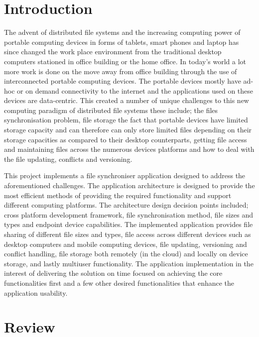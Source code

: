 \documentclass[11pt]{article}
\begin{document}
\section{Introduction}

The advent of distributed file systems and the increasing computing power of portable computing devices in forms of tablets, smart phones and laptop has since changed the work place environment from the traditional desktop computers stationed in office building or the home office. In today's world a lot more work is done on the move away from office building through the use of interconnected portable computing devices. The portable devices mostly have ad-hoc or on demand connectivity to the internet and the applications used on these devices are data-centric. This created a number of unique challenges to this new computing paradigm of distributed file systems these include; the files synchronisation problem, file storage the fact that portable devices have limited storage capacity and can therefore can only store limited files depending on their storage capacities as compared to their desktop counterparts, getting file access and maintaining files across the numerous devices platforms and how to deal with the file updating, conflicts and versioning.

This project implements a file synchroniser application designed to address the aforementioned challenges. The application architecture is designed to provide the most efficient methods of providing the required functionality and support different computing platforms. The architecture design decision points included; cross platform development framework, file synchronisation method, file sizes and types and endpoint device capabilities. The implemented application provides file sharing of different file sizes and types, file access across different devices such as desktop computers and mobile computing devices, file updating, versioning and conflict handling, file storage both remotely (in the cloud) and locally on device storage, and lastly multiuser functionality. The application implementation in the interest of delivering the solution on time focused on achieving the core functionalities first and a few other desired functionalities that enhance the application usability.


\section{Review}
\end{document}
